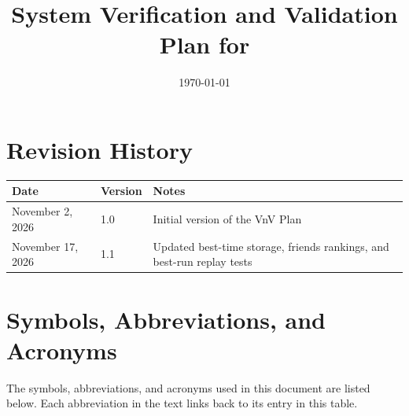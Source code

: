 \documentclass[12pt, titlepage]{article}
\begin{document}
\title{System Verification and Validation Plan for \progname{}} 
\author{\authname}
\date{\today}
	
\maketitle


\section*{Revision History}

\begin{tabularx}{\textwidth}{p{3cm}p{2cm}X}
\toprule {\bf Date} & {\bf Version} & {\bf Notes}\\
\midrule
November 2, 2026 & 1.0 & Initial version of the VnV Plan\\
November 17, 2026 & 1.1 & Updated best-time storage, friends rankings, and best-run replay tests\\
\bottomrule
\end{tabularx}

\newpage

\tableofcontents

\listoftables

\listoffigures

\newpage

\section{Symbols, Abbreviations, and Acronyms}

The symbols, abbreviations, and acronyms used in this document are listed below. Each
abbreviation in the text links back to its entry in this table.
\end{document}

